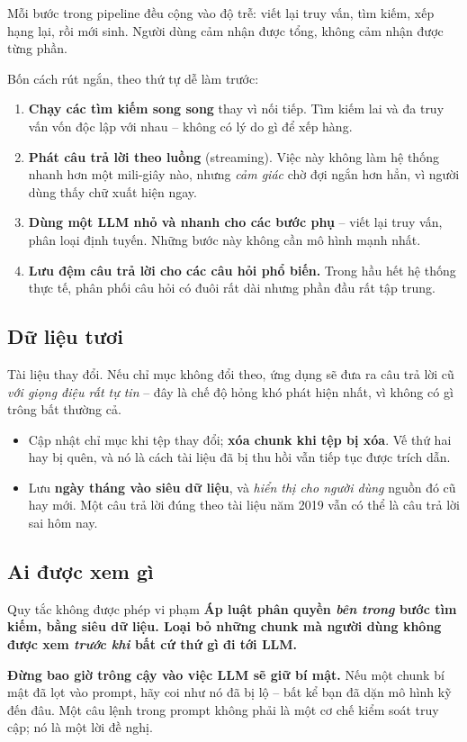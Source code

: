 Mỗi bước trong pipeline đều cộng vào độ trễ: viết lại truy vấn, tìm kiếm, xếp hạng lại, rồi mới sinh. Người dùng cảm nhận được tổng, không cảm nhận được từng phần.

Bốn cách rút ngắn, theo thứ tự dễ làm trước:
\begin{enumerate}
	\item \textbf{Chạy các tìm kiếm song song} thay vì nối tiếp. Tìm kiếm lai và đa truy vấn vốn độc lập với nhau -- không có lý do gì để xếp hàng.
	\item \textbf{Phát câu trả lời theo luồng} (streaming). Việc này không làm hệ thống nhanh hơn một mili-giây nào, nhưng \emph{cảm giác} chờ đợi ngắn hơn hẳn, vì người dùng thấy chữ xuất hiện ngay.
	\item \textbf{Dùng một LLM nhỏ và nhanh cho các bước phụ} -- viết lại truy vấn, phân loại định tuyến. Những bước này không cần mô hình mạnh nhất.
	\item \textbf{Lưu đệm câu trả lời cho các câu hỏi phổ biến.} Trong hầu hết hệ thống thực tế, phân phối câu hỏi có đuôi rất dài nhưng phần đầu rất tập trung.
\end{enumerate}

\subsection{Dữ liệu tươi}
\label{ssec:rag_freshness}

Tài liệu thay đổi. Nếu chỉ mục không đổi theo, ứng dụng sẽ đưa ra câu trả lời cũ \emph{với giọng điệu rất tự tin} -- đây là chế độ hỏng khó phát hiện nhất, vì không có gì trông bất thường cả.

\begin{itemize}
	\item Cập nhật chỉ mục khi tệp thay đổi; \textbf{xóa chunk khi tệp bị xóa}. Vế thứ hai hay bị quên, và nó là cách tài liệu đã bị thu hồi vẫn tiếp tục được trích dẫn.
	\item Lưu \textbf{ngày tháng vào siêu dữ liệu}, và \emph{hiển thị cho người dùng} nguồn đó cũ hay mới. Một câu trả lời đúng theo tài liệu năm 2019 vẫn có thể là câu trả lời sai hôm nay.
\end{itemize}

\subsection{Ai được xem gì}
\label{ssec:rag_access_control}

\begin{pitfall}{Quy tắc không được phép vi phạm}
\textbf{Áp luật phân quyền \emph{bên trong} bước tìm kiếm, bằng siêu dữ liệu. Loại bỏ những chunk mà người dùng không được xem \emph{trước khi} bất cứ thứ gì đi tới LLM.}

\textbf{Đừng bao giờ trông cậy vào việc LLM sẽ giữ bí mật.} Nếu một chunk bí mật đã lọt vào prompt, hãy coi như nó đã bị lộ -- bất kể bạn đã dặn mô hình kỹ đến đâu. Một câu lệnh trong prompt không phải là một cơ chế kiểm soát truy cập; nó là một lời đề nghị.
\end{pitfall}

